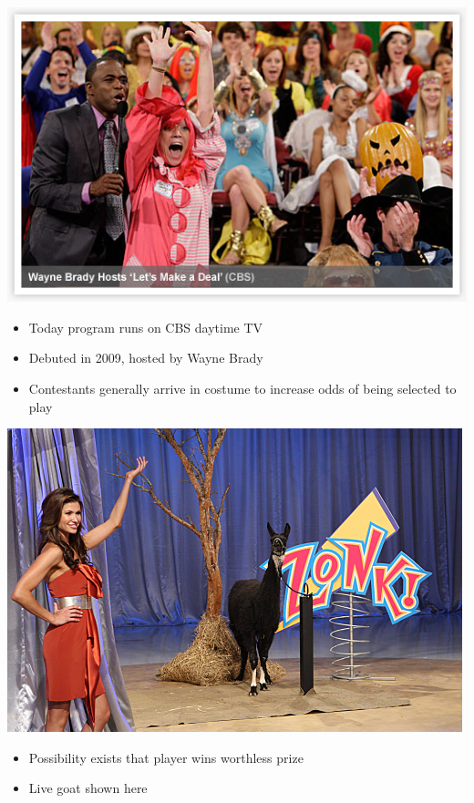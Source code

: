 \documentclass[handout]{beamer}
\theoremstyle{definition}
\begin{document}
\begin{frame}
\begin{center}\includegraphics[scale=.5]{WayneBrady}\end{center}
\begin{itemize}
\item Today program runs on CBS daytime TV
\item Debuted in 2009, hosted by Wayne Brady
\item Contestants generally arrive in costume
to increase odds of being selected to play
\end{itemize}
\end{frame}

\begin{frame}
\begin{center}\includegraphics[scale=1.25]{Goat}\end{center}
\begin{itemize}
\item Possibility exists that player wins worthless prize
\item Live goat shown here
\end{itemize}
\end{frame}
\end{document}
